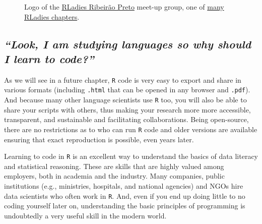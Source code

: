 \documentclass[
  letterpaper,
  DIV=11,
  numbers=noendperiod,
  oneside]{scrreprt}
\begin{document}
\begin{figure}


\caption{\label{fig-RLadies}Logo of the
\href{https://rladiesrp.github.io/}{RLadies Ribeirão Preto} meet-up
group, one of
\href{https://benubah.github.io/r-community-explorer/rladies.html}{many
RLadies chapters}.}

\end{figure}%

\subsection*{\texorpdfstring{\emph{``Look, I am studying languages so
why should I learn to code?''}
🤔}{``Look, I am studying languages so why should I learn to code?'' 🤔}}\label{look-i-am-studying-languages-so-why-should-i-learn-to-code}

As we will see in a future chapter, \texttt{R} code is very easy to
export and share in various formats (including \texttt{.html} that can
be opened in any browser and \texttt{.pdf}). And because many other
language scientists use \texttt{R} too, you will also be able to share
your scripts with others, thus making your research more more
accessible, transparent, and sustainable and facilitating
collaborations. Being open-source, there are no restrictions as to who
can run \texttt{R} code and older versions are available ensuring that
exact reproduction is possible, even years later.

Learning to code in \texttt{R} is an excellent way to understand the
basics of data literacy and statistical reasoning. These are skills that
are highly valued among employers, both in academia and the industry.
Many companies, public institutions (e.g., ministries, hospitals, and
national agencies) and NGOs hire data scientists who often work in
\texttt{R}. And, even if you end up doing little to no coding yourself
later on, understanding the basic principles of programming is
undoubtedly a very useful skill in the modern world.
\end{document}
